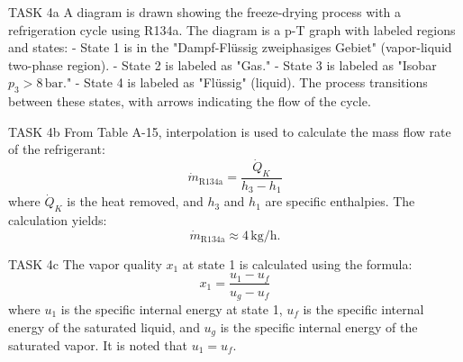 TASK 4a  
A diagram is drawn showing the freeze-drying process with a refrigeration cycle using R134a. The diagram is a p-T graph with labeled regions and states:  
- State 1 is in the "Dampf-Flüssig zweiphasiges Gebiet" (vapor-liquid two-phase region).  
- State 2 is labeled as "Gas."  
- State 3 is labeled as "Isobar \( p_3 > 8 \, \text{bar} \)."  
- State 4 is labeled as "Flüssig" (liquid).  
The process transitions between these states, with arrows indicating the flow of the cycle.  

TASK 4b  
From Table A-15, interpolation is used to calculate the mass flow rate of the refrigerant:  
\[
\dot{m}_{\text{R134a}} = \frac{\dot{Q}_K}{h_3 - h_1}
\]  
where \( \dot{Q}_K \) is the heat removed, and \( h_3 \) and \( h_1 \) are specific enthalpies.  
The calculation yields:  
\[
\dot{m}_{\text{R134a}} \approx 4 \, \text{kg/h}.
\]  

TASK 4c  
The vapor quality \( x_1 \) at state 1 is calculated using the formula:  
\[
x_1 = \frac{u_1 - u_f}{u_g - u_f}
\]  
where \( u_1 \) is the specific internal energy at state 1, \( u_f \) is the specific internal energy of the saturated liquid, and \( u_g \) is the specific internal energy of the saturated vapor.  
It is noted that \( u_1 = u_f \).